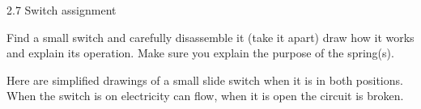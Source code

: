 
2.7 Switch assignment

Find a small switch and carefully disassemble it (take it apart) draw how it
works and explain its operation. Make sure you explain the purpose of the
spring(s).

Here are simplified drawings of a small slide switch when it is in both
positions. When the switch is on electricity can flow, when it is open the
circuit is broken.

